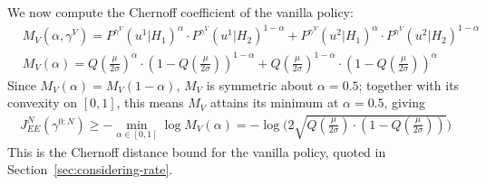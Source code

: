 \documentclass[11pt]{article}
\newcommand{\JNEE}{J^N_{EE}(\gamma^{0:N})}
\begin{document}
We now compute the Chernoff coefficient of the vanilla policy:
\begin{align}
    &M_{V}(\alpha,\gamma^V) = P^{\gamma^V}(u^1|H_1)^\alpha \cdot P^{\gamma^V}(u^1|H_2)^{1-\alpha} + P^{\gamma^V}(u^2|H_1)^\alpha \cdot P^{\gamma^V}(u^2|H_2)^{1-\alpha}\\
    &M_{V}(\alpha) = Q(\frac{\mu}{2\sigma})^{\alpha} \cdot (1-Q(\frac{\mu}{2\sigma}))^{1-\alpha} + Q(\frac{\mu}{2\sigma})^{1-\alpha} \cdot (1-Q(\frac{\mu}{2\sigma}))^{\alpha}
\end{align}
Since $M_V(\alpha) = M_V(1-\alpha)$, $M_V$ is symmetric about $\alpha = 0.5$; together with its convexity on $[0,1]$, this means $M_V$ attains its minimum at $\alpha = 0.5$, giving
\begin{align}
    \JNEE \geq -\min_{\alpha\in[0,1]}\log M_{V}(\alpha) = -\log\bigg(2 \sqrt{Q(\frac{\mu}{2\sigma}) \cdot (1-Q(\frac{\mu}{2\sigma}))}\bigg)
\end{align}
This is the Chernoff distance bound for the vanilla policy, quoted in Section~\ref{sec:considering-rate}.
\end{document}
